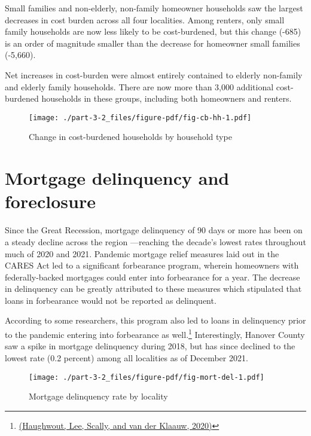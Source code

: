 \documentclass[
  letterpaper,
  DIV=11,
  numbers=noendperiod]{scrreprt}
\begin{document}
Small families and non-elderly, non-family homeowner households saw the
largest decreases in cost burden across all four localities. Among
renters, only small family households are now less likely to be
cost-burdened, but this change (-685) is an order of magnitude smaller
than the decrease for homeowner small families (-5,660).

Net increases in cost-burden were almost entirely contained to elderly
non-family and elderly family households. There are now more than 3,000
additional cost-burdened households in these groups, including both
homeowners and renters.

\begin{figure}

{\centering \texttt{[image: ./part-3-2\_files/figure-pdf/fig-cb-hh-1.pdf]}

}

\caption{\label{fig-cb-hh}Change in cost-burdened households by
household type}

\end{figure}

\hypertarget{mortgage-delinquency-and-foreclosure}{%
\section{Mortgage delinquency and
foreclosure}\label{mortgage-delinquency-and-foreclosure}}

Since the Great Recession, mortgage delinquency of 90 days or more has
been on a steady decline across the region ---reaching the decade's
lowest rates throughout much of 2020 and 2021. Pandemic mortgage relief
measures laid out in the CARES Act led to a significant forbearance
program, wherein homeowners with federally-backed mortgages could enter
into forbearance for a year. The decrease in delinquency can be greatly
attributed to these measures which stipulated that loans in forbearance
would not be reported as delinquent.

According to some researchers, this program also led to loans in
delinquency prior to the pandemic entering into forbearance as
well.\footnote{\href{https://libertystreeteconomics.newyorkfed.org/2020/11/following-borrowers-through-forbearance/}{(Haughwout,
  Lee, Scally, and van der Klaauw, 2020)}} Interestingly, Hanover County
saw a spike in mortgage delinquency during 2018, but has since declined
to the lowest rate (0.2 percent) among all localities as of December
2021.

\begin{figure}

{\centering \texttt{[image: ./part-3-2\_files/figure-pdf/fig-mort-del-1.pdf]}

}

\caption{\label{fig-mort-del}Mortgage delinquency rate by locality}

\end{figure}
\end{document}
